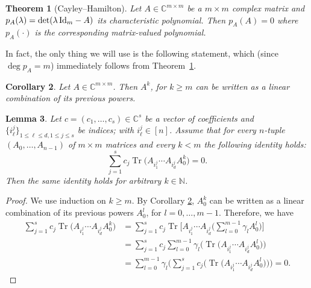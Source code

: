 \documentclass[10pt,a4paper]{amsart}
\numberwithin{equation}{section}
\newtheorem{Theorem}{Theorem}[section]
\newtheorem{Corollary}[Theorem]{Corollary}
\newtheorem{Lemma}[Theorem]{Lemma}
\DeclareMathOperator{\Tr}{Tr}
\newcommand{\CC}{\mathbb{C}}
\begin{document}
\begin{Theorem}[Cayley--Hamilton]\label{theorem: CH}
Let $A\in {\mathbb C}^{m\times m}$ be a $m\times m$ complex matrix and $p_A(\lambda)=\det(\lambda \,{\rm Id}_m -A)$ its characteristic polynomial. Then $p_A(A)=0$ where $p_A(\cdot)$ is the corresponding matrix-valued polynomial.
\end{Theorem}
In fact, the only thing we will use is the following statement, which (since $\deg p_A = m$) immediately follows from Theorem~\ref{theorem: CH}.
\begin{Corollary}\label{cor: CH}
	Let $A\in {\mathbb C}^{m\times m}$. Then $A^k$, for $k\geq m$ can be written as a linear combination of its previous powers.
\end{Corollary}
\begin{Lemma}\label{lemma: CH}
    Let $c = (c_1,\dots,c_s) \in \CC^s$ be a vector of coefficients and $\big\{i_\ell^{j}\big\}_{1\leq\ell\leq d, 1 \leq j \leq s}$ be indices; with $i_\ell^{j} \in [n]$.
    Assume that for every $n$-tuple $(A_0,\dots,A_{n-1})$ of $m \times m$ matrices and every $k < m$ the following identity holds:
    \begin{equation} \label{eq:lemCH}
        \sum_{j=1}^s c_j \Tr\big(A_{i_1^j} \cdots A_{i_d^j}A_0^k\big)=0.
    \end{equation}
	Then the same identity holds for arbitrary $k \in {\mathbb N}$.
\end{Lemma}
\begin{proof}
	We use induction on $k \geq m$. By Corollary \ref{cor: CH}, $A_0^k$ can be written as a linear combination of its previous powers $A_0^l$, for $l=0,\dots,m-1$. Therefore, we have
	\begin{align*}
	    \sum_{j=1}^{s}c_j \Tr\big(A_{i_1^j}\cdots A_{i_d^j} A_{0}^k\big)
	    & = \sum_{j=1}^{s}c_j \Tr\bigg[A_{i_1^j}\cdots A_{i_d^j} \bigg(\sum_{l=0}^{m-1}\gamma_l A_0^l\bigg)\bigg]\\
	    & = \sum_{j=1}^s c_j\sum_{l=0}^{m-1} \gamma_l \big(\Tr\big(A_{i_1^j}\cdots A_{i_d^j} A_{0}^l\big)\big)\\
	    & = \sum_{l=0}^{m-1} \gamma_l \bigg(\sum_{j=1}^s c_j \big(\Tr\big(A_{i_1^j}\cdots A_{i_d^j} A_{0}^l\big)\big)\bigg)=0.\tag*{\qed}
	\end{align*}\renewcommand{\qed}{}
\end{proof}
\end{document}
